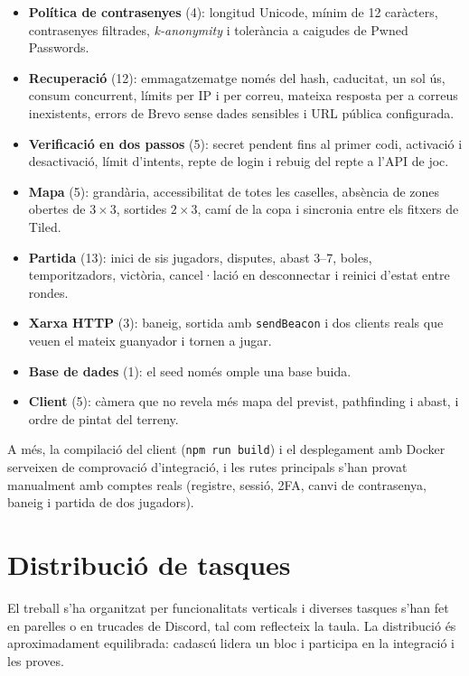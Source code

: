 \documentclass[11pt,a4paper]{article}
\begin{document}
\begin{itemize}
  \item \textbf{Política de contrasenyes} (4): longitud Unicode, mínim de 12 caràcters,
        contrasenyes filtrades, \emph{k-anonymity} i tolerància a caigudes de Pwned
        Passwords.
  \item \textbf{Recuperació} (12): emmagatzematge només del hash, caducitat, un sol ús,
        consum concurrent, límits per IP i per correu, mateixa resposta per a correus
        inexistents, errors de Brevo sense dades sensibles i URL pública configurada.
  \item \textbf{Verificació en dos passos} (5): secret pendent fins al primer codi,
        activació i desactivació, límit d'intents, repte de login i rebuig del repte a
        l'API de joc.
  \item \textbf{Mapa} (5): grandària, accessibilitat de totes les caselles, absència de
        zones obertes de $3 \times 3$, sortides $2 \times 3$, camí de la copa i
        sincronia entre els fitxers de Tiled.
  \item \textbf{Partida} (13): inici de sis jugadors, disputes, abast 3--7, boles,
        temporitzadors, victòria, cancel·lació en desconnectar i reinici d'estat entre
        rondes.
  \item \textbf{Xarxa HTTP} (3): baneig, sortida amb \texttt{sendBeacon} i dos clients
        reals que veuen el mateix guanyador i tornen a jugar.
  \item \textbf{Base de dades} (1): el seed només omple una base buida.
  \item \textbf{Client} (5): càmera que no revela més mapa del previst, pathfinding i
        abast, i ordre de pintat del terreny.
\end{itemize}

A més, la compilació del client (\texttt{npm run build}) i el desplegament amb Docker
serveixen de comprovació d'integració, i les rutes principals s'han provat manualment
amb comptes reals (registre, sessió, 2FA, canvi de contrasenya, baneig i partida de dos
jugadors).

\section{Distribució de tasques}
\label{sec:tasques}

El treball s'ha organitzat per funcionalitats verticals i diverses tasques s'han fet en
parelles o en trucades de Discord, tal com reflecteix la taula. La distribució és
aproximadament equilibrada: cadascú lidera un bloc i participa en la integració i les
proves.
\end{document}
